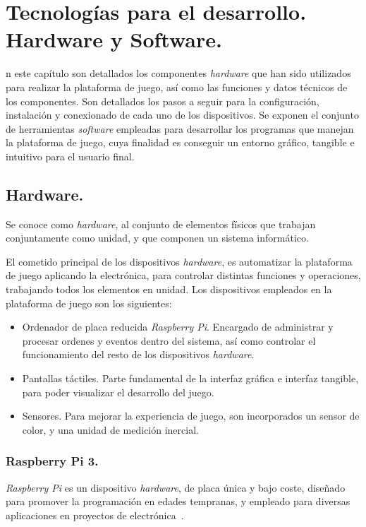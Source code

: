 \chapter{Tecnologías para el desarrollo. Hardware y Software.}
\label{chap:tecnologias}

\noindent
{}n este capítulo son detallados los componentes \emph{hardware} que han sido utilizados para realizar la plataforma de juego, así como las funciones y datos técnicos de los componentes. Son detallados los pasos a seguir para la configuración, instalación y conexionado de cada uno de los dispositivos. Se exponen el conjunto de herramientas \emph{software} empleadas para desarrollar los programas que manejan la plataforma de juego, cuya finalidad es conseguir un entorno gráfico, tangible e intuitivo para el usuario final.


\section{Hardware.}
\label{sec:hardware}
Se conoce como \emph{hardware}, al conjunto de elementos físicos que trabajan conjuntamente como unidad, y que componen un sistema informático.

El cometido principal de los dispositivos \emph{hardware}, es automatizar la plataforma de juego aplicando la electrónica, para controlar distintas funciones y operaciones, trabajando todos los elementos en unidad.
Los dispositivos empleados en la plataforma de juego son los siguientes:
\begin{itemize}
\item Ordenador de placa reducida \emph{Raspberry Pi}. Encargado de administrar y procesar ordenes y eventos dentro del sistema, así como controlar el funcionamiento del resto de los dispositivos \emph{hardware}.
\item Pantallas táctiles. Parte fundamental de la interfaz gráfica e interfaz tangible, para poder visualizar el desarrollo del juego.
\item Sensores. Para mejorar la experiencia de juego, son incorporados un sensor de color, y una unidad de medición inercial.
\end{itemize}

\subsection{Raspberry Pi 3.}
\label{subsubs:rasp}
\emph{Raspberry Pi} es un dispositivo \emph{hardware}, de placa única y bajo coste, diseñado para promover la programación en edades tempranas, y empleado para diversas aplicaciones en proyectos de electrónica~\cite{Upton}.\

